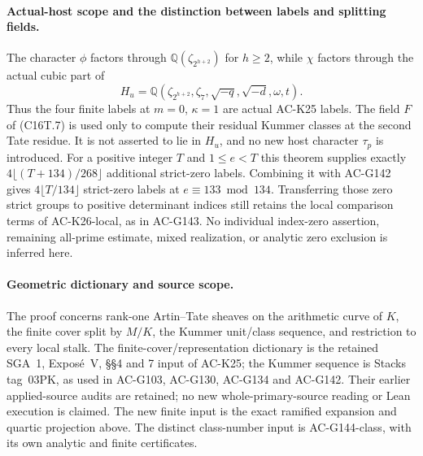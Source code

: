 \paragraph{Actual-host scope and the distinction between labels and splitting fields.}
The character $\phi$ factors through
$\mathbb Q(\zeta_{2^{h+2}})$ for $h\geq2$, while $\chi$ factors
through the actual cubic part of
\[
 H_u=\mathbb Q(\zeta_{2^{h+2}},\zeta_7,\sqrt{-q},\sqrt{-d},\omega,t).
\]
Thus the four finite labels at $m=0$, $\kappa=1$ are actual
AC-K25 labels.  The field $F$ of (C16T.7) is used only to
compute their residual Kummer classes at the second Tate residue.
It is not asserted to lie in $H_u$, and no new host character
$\tau_p$ is introduced.
For a positive integer $T$ and $1\leq e<T$ this theorem supplies exactly
$4\lfloor(T+134)/268\rfloor$ additional strict-zero labels.
Combining it with AC-G142 gives
$4\lfloor T/134\rfloor$ strict-zero labels at
$e\equiv133\bmod134$.
Transferring those zero strict groups to positive determinant indices
still retains the local comparison terms of AC-K26-local,
as in AC-G143.  No individual index-zero assertion, remaining
all-prime estimate, mixed realization, or analytic zero exclusion
is inferred here.

\paragraph{Geometric dictionary and source scope.}
The proof concerns rank-one Artin--Tate sheaves on the arithmetic
curve of $K$, the finite cover split by $M/K$, the Kummer
unit/class sequence, and restriction to every local stalk.
The finite-cover/representation dictionary is the retained
SGA~1, Expos\'e~V, \S\S4 and 7 input of AC-K25;
the Kummer sequence is Stacks tag~03PK, as used in AC-G103,
AC-G130, AC-G134 and AC-G142.
Their earlier applied-source audits are retained; no new
whole-primary-source reading or Lean execution is claimed.
The new finite input is the exact ramified expansion and
quartic projection above.  The distinct class-number input is
AC-G144-class, with its own analytic and finite certificates.
